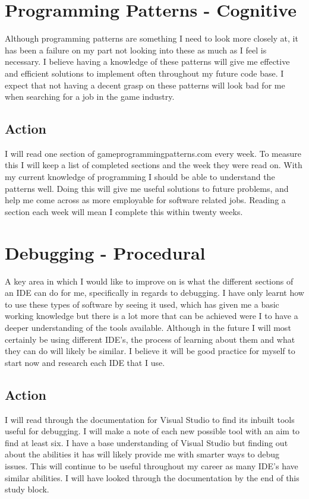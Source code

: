 \documentclass{scrartcl}
\begin{document}
\section{Programming Patterns - Cognitive}
Although programming patterns are something I need to look more closely at, it has been a failure on my part not looking into these as much as I feel is necessary. I believe having a knowledge of these patterns will give me effective and efficient solutions to implement often throughout my future code base. I expect that not having a decent grasp on these patterns will look bad for me when searching for a job in the game industry.
\subsection{Action}
I will read one section of gameprogrammingpatterns.com every week. To measure this I will keep a list of completed sections and the week they were read on. With my current knowledge of programming I should be able to understand the patterns well. Doing this will give me useful solutions to future problems, and help me come across as more employable for software related jobs. Reading a section each week will mean I complete this within twenty weeks.

\section{Debugging - Procedural}
A key area in which I would like to improve on is what the different sections of an IDE can do for me, specifically in regards to debugging. I have only learnt how to use these types of software by seeing it used, which has given me a basic working knowledge but there is a lot more that can be achieved were I to have a deeper understanding of the tools available. Although in the future I will most certainly be using different IDE's, the process of learning about them and what they can do will likely be similar. I believe it will be good practice for myself to start now and research each IDE that I use.
\subsection{Action}
I will read through the documentation for Visual Studio to find its inbuilt tools useful for debugging. I will make a note of each new possible tool with an aim to find at least six. I have a base understanding of Visual Studio but finding out about the abilities it has will likely provide me with smarter ways to debug issues. This will continue to be useful throughout my career as many IDE's have similar abilities. I will have looked through the documentation by the end of this study block.
\end{document}
